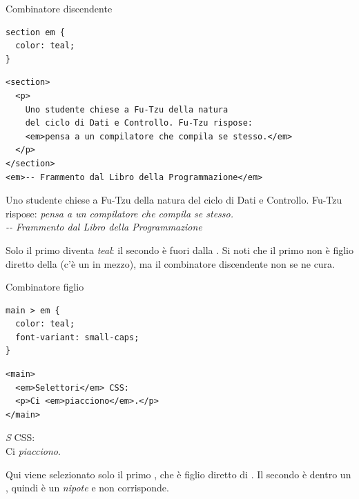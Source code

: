 \begin{esempio}{Combinatore discendente}
\begin{affianco}[0.55]
\begin{lstlisting}[style=css]
section em {
  color: teal;
}
\end{lstlisting}
\begin{lstlisting}[style=html, name=discendente.html]
<section>
  <p>
    Uno studente chiese a Fu-Tzu della natura
    del ciclo di Dati e Controllo. Fu-Tzu rispose:
    <em>pensa a un compilatore che compila se stesso.</em>
  </p>
</section>
<em>-- Frammento dal Libro della Programmazione</em>
\end{lstlisting}
\risultato
\begin{browser}
  Uno studente chiese a Fu-Tzu della natura del ciclo di Dati e Controllo.
  Fu-Tzu rispose: \textcolor{css-teal}{\textit{pensa a un compilatore che
  compila se stesso.}}\\[8pt]
  \textit{-{}- Frammento dal Libro della Programmazione}
\end{browser}
\end{affianco}

Solo il primo  diventa \textit{teal}: il secondo è fuori dalla
. Si noti che il primo  non è figlio diretto della
 (c'è un  in mezzo), ma il combinatore discendente non se ne
cura.
\end{esempio}

\begin{esempio}{Combinatore figlio}
\begin{affianco}[0.5]
\begin{lstlisting}[style=css]
main > em {
  color: teal;
  font-variant: small-caps;
}
\end{lstlisting}
\begin{lstlisting}[style=html, name=figlio.html]
<main>
  <em>Selettori</em> CSS:
  <p>Ci <em>piacciono</em>.</p>
</main>
\end{lstlisting}
\risultato
\begin{browser}
  \textcolor{css-teal}{\textit{S}} CSS:\\[8pt]
  Ci \textit{piacciono}.
\end{browser}
\end{affianco}

Qui viene selezionato solo il primo , che è figlio diretto di
. Il secondo è dentro un , quindi è un \textit{nipote} e non
corrisponde.
\end{esempio}

